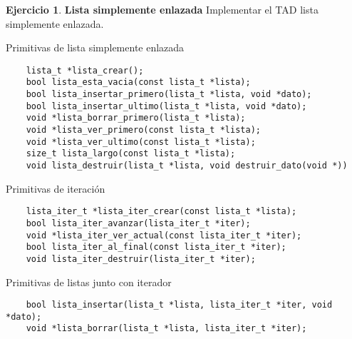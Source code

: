 \documentclass[11pt,a4paper]{article}
\theoremstyle{definition}
\newtheorem{ejercicio}{Ejercicio}[section]
\begin{document}
\begin{ejercicio}
\textbf{Lista simplemente enlazada} Implementar el TAD lista simplemente
enlazada.
\begin{partes}
\item Primitivas de lista simplemente enlazada
\begin{lstlisting}
    lista_t *lista_crear();
    bool lista_esta_vacia(const lista_t *lista);
    bool lista_insertar_primero(lista_t *lista, void *dato);
    bool lista_insertar_ultimo(lista_t *lista, void *dato);
    void *lista_borrar_primero(lista_t *lista);
    void *lista_ver_primero(const lista_t *lista);
    void *lista_ver_ultimo(const lista_t *lista);
    size_t lista_largo(const lista_t *lista);
    void lista_destruir(lista_t *lista, void destruir_dato(void *))
\end{lstlisting}

\item Primitivas de iteración
\begin{lstlisting}
    lista_iter_t *lista_iter_crear(const lista_t *lista);
    bool lista_iter_avanzar(lista_iter_t *iter);
    void *lista_iter_ver_actual(const lista_iter_t *iter);
    bool lista_iter_al_final(const lista_iter_t *iter);
    void lista_iter_destruir(lista_iter_t *iter);
\end{lstlisting}

\item Primitivas de listas junto con iterador
\begin{lstlisting}
    bool lista_insertar(lista_t *lista, lista_iter_t *iter, void *dato);
    void *lista_borrar(lista_t *lista, lista_iter_t *iter);
\end{lstlisting}

\end{partes}
\end{ejercicio}
\end{document}
